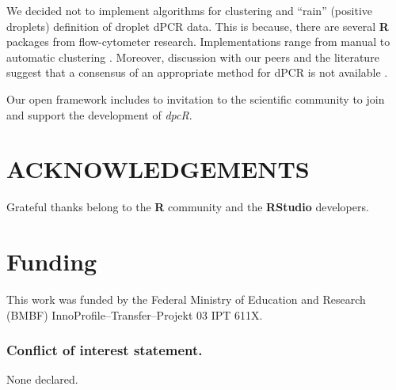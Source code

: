 \documentclass[a4,center,fleqn]{NAR}
\begin{document}
We decided not to implement algorithms for clustering and ``rain'' (positive 
droplets) definition of droplet dPCR data. This is because, there are several 
\textbf{R} packages from flow-cytometer research. Implementations range from 
manual to automatic clustering \cite{le_meur_computational_2013, Malek15022015, 
trypsteen_ddpcrquant_2015}. Moreover, discussion with our peers and the 
literature suggest that a consensus of an appropriate method for dPCR is not 
available \cite{trypsteen_ddpcrquant_2015}.

Our open framework includes to invitation to the scientific community to join and 
support the development of \textit{dpcR}.


\section{ACKNOWLEDGEMENTS}

Grateful thanks belong to the \textbf{R} community and the \textbf{RStudio} developers.

\section{Funding}
This work was funded by the Federal Ministry of Education and Research (BMBF) InnoProfile--Transfer--Projekt 03 IPT 611X.
 
\subsubsection{Conflict of interest statement.} None declared.



\end{document}
